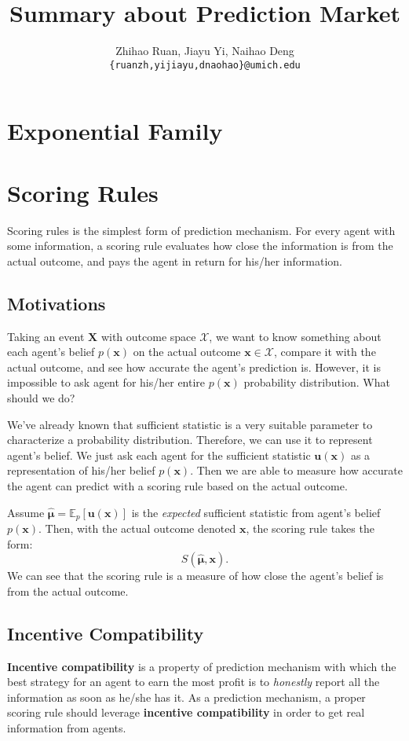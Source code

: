 \documentclass[12pt]{article}
\title{\textbf{Summary about Prediction Market}}
\author{Zhihao Ruan, Jiayu Yi, Naihao Deng\\\texttt{\{ruanzh,yijiayu,dnaohao\}@umich.edu}}
\begin{document}
\maketitle
\tableofcontents


\newpage
\section{Exponential Family}

\newpage
\section{Scoring Rules}
Scoring rules is the simplest form of prediction mechanism. For every agent with some information, a scoring rule evaluates how close the information is from the actual outcome, and pays the agent in return for his/her information.

\subsection{Motivations}
Taking an event $\mathbf{X}$ with outcome space $\mathcal{X}$, we want to know something about each agent's belief $p(\mathbf{x})$ on the actual outcome $\mathbf{x}\in \mathcal{X}$, compare it with the actual outcome, and see how accurate the agent's prediction is. However, it is impossible to ask agent for his/her entire $p(\mathbf{x})$ probability distribution. What should we do?

We've already known that sufficient statistic is a very suitable parameter to characterize a probability distribution. Therefore, we can use it to represent agent's belief. We just ask each agent for the sufficient statistic $\mathbf{u}(\mathbf{x})$ as a representation of his/her belief $p(\mathbf{x})$. Then we are able to measure how accurate the agent can predict with a scoring rule based on the actual outcome.

Assume $\bm{\hat{\mu}}=\mathbb{E}_p[\mathbf{u}(\mathbf{x})]$ is the \textit{expected} sufficient statistic from agent's belief $p(\mathbf{x})$. Then, with the actual outcome denoted $\mathbf{x}$, the scoring rule takes the form:
\[S(\bm{\hat{\mu}},\mathbf{x}).\]
We can see that the scoring rule is a measure of how close the agent's belief is from the actual outcome.

\subsection{Incentive Compatibility}
\textbf{Incentive compatibility} is a property of prediction mechanism with which the best strategy for an agent to earn the most profit is to \textit{honestly} report all the information as soon as he/she has it. As a prediction mechanism, a proper scoring rule should leverage \textbf{incentive compatibility} in order to get real information from agents.
\end{document}
